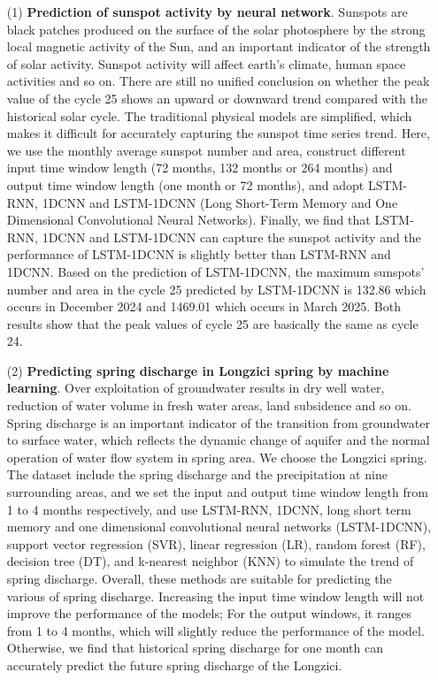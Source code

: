 \begin{enumerate}

  \item[(1)] \textbf{Prediction of sunspot activity by neural network}. Sunspots are black patches produced on the surface of the solar photosphere by the strong local magnetic activity of the Sun, and an important indicator of the strength of solar activity. Sunspot activity will affect earth's climate, human space activities and so on. There are still no unified conclusion on whether the peak value of the cycle 25 shows an upward or downward trend compared with the historical solar cycle. The traditional physical models are simplified, which makes it difficult for accurately capturing the sunspot time series trend. Here, we use the monthly average sunspot number and area, construct different input time window length (72 months, 132 months or 264 months) and output time window length (one month or 72 months), and adopt LSTM-RNN, 1DCNN and LSTM-1DCNN (Long Short-Term Memory and One Dimensional Convolutional Neural Networks). Finally, we find that LSTM-RNN, 1DCNN and LSTM-1DCNN can capture the sunspot activity and the performance of LSTM-1DCNN is slightly better than LSTM-RNN and 1DCNN. Based on the prediction of LSTM-1DCNN, the maximum sunspots' number and area in the cycle 25 predicted by LSTM-1DCNN is 132.86 which occurs in December 2024 and 1469.01 which occurs in March 2025. Both results show that the peak values of cycle 25 are basically the same as cycle 24. 

  \item[(2)] \textbf{Predicting spring discharge in Longzici spring by machine learning}. Over exploitation of groundwater results in dry well water, reduction of water volume in fresh water areas, land subsidence and so on. Spring discharge is an important indicator of the transition from groundwater to surface water, which reflects the dynamic change of aquifer and the normal operation of water flow system in spring area. We choose the Longzici spring. The dataset include the spring discharge and the precipitation at nine surrounding areas, and we set the input and output time window length from 1 to 4 months respectively, and use LSTM-RNN, 1DCNN, long short term memory and one dimensional convolutional neural networks (LSTM-1DCNN), support vector regression (SVR), linear regression (LR), random forest (RF), decision tree (DT), and k-nearest neighbor (KNN) to simulate the trend of spring discharge.
  Overall, these methods are suitable for predicting the various of spring discharge. Increasing the input time window length will not improve the performance of the models; For the output windows, it ranges from 1 to 4 months, which will slightly reduce the performance of the model. Otherwise, we find that historical spring discharge for one month can accurately predict the future spring discharge of the Longzici.
  

\end{enumerate}

